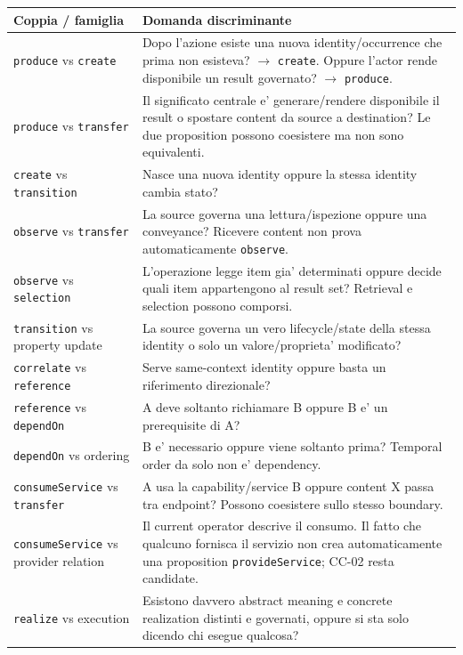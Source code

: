 \documentclass[11pt,a4paper]{article}
\begin{document}
\begin{longtable}{L{44mm}L{95mm}}
\toprule
\textbf{Coppia / famiglia} & \textbf{Domanda discriminante} \\
\midrule\endhead
\texttt{produce} vs \texttt{create} & Dopo l'azione esiste una nuova identity/occurrence che prima non esisteva? $\rightarrow$ \texttt{create}. Oppure l'actor rende disponibile un result governato? $\rightarrow$ \texttt{produce}. \\
\texttt{produce} vs \texttt{transfer} & Il significato centrale e' generare/rendere disponibile il result o spostare content da source a destination? Le due proposition possono coesistere ma non sono equivalenti. \\
\texttt{create} vs \texttt{transition} & Nasce una nuova identity oppure la stessa identity cambia stato? \\
\texttt{observe} vs \texttt{transfer} & La source governa una lettura/ispezione oppure una conveyance? Ricevere content non prova automaticamente \texttt{observe}. \\
\texttt{observe} vs \texttt{selection} & L'operazione legge item gia' determinati oppure decide quali item appartengono al result set? Retrieval e selection possono comporsi. \\
\texttt{transition} vs property update & La source governa un vero lifecycle/state della stessa identity o solo un valore/proprieta' modificato? \\
\texttt{correlate} vs \texttt{reference} & Serve same-context identity oppure basta un riferimento direzionale? \\
\texttt{reference} vs \texttt{dependOn} & A deve soltanto richiamare B oppure B e' un prerequisite di A? \\
\texttt{dependOn} vs ordering & B e' necessario oppure viene soltanto prima? Temporal order da solo non e' dependency. \\
\texttt{consumeService} vs \texttt{transfer} & A usa la capability/service B oppure content X passa tra endpoint? Possono coesistere sullo stesso boundary. \\
\texttt{consumeService} vs provider relation & Il current operator descrive il consumo. Il fatto che qualcuno fornisca il servizio non crea automaticamente una proposition \texttt{provideService}; CC-02 resta candidate. \\
\texttt{realize} vs execution & Esistono davvero abstract meaning e concrete realization distinti e governati, oppure si sta solo dicendo chi esegue qualcosa? \\

\end{longtable}
\end{document}
